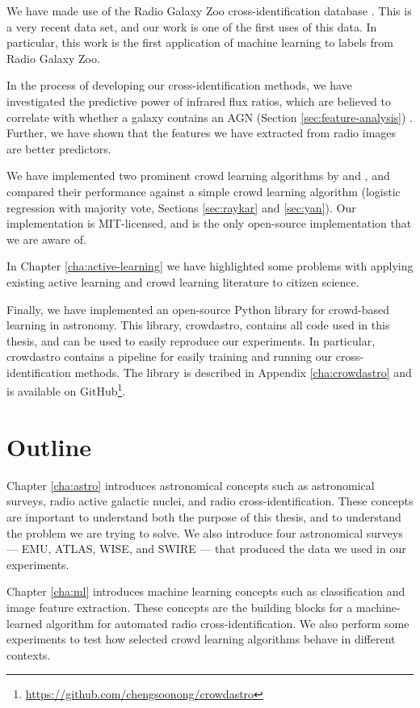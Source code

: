   We have made use of the Radio Galaxy Zoo cross-identification database
  \citep{banfield15}. This is a very recent data set, and our work is one of the
  first uses of this data. In particular, this work is the first application of
  machine learning to labels from Radio Galaxy Zoo.

  In the process of developing our cross-identification methods, we have
  investigated the predictive power of infrared flux ratios, which are believed
  to correlate with whether a galaxy contains an AGN (Section
  \ref{sec:feature-analysis}) \citep{banfield15}. Further, we have shown that
  the features we have extracted from radio images are better predictors.

  We have implemented two prominent crowd learning algorithms by
  \citet{raykar10} and \citet{yan10}, and compared their performance against a
  simple crowd learning algorithm (logistic regression with majority vote,
  Sections \ref{sec:raykar} and \ref{sec:yan}). Our implementation is
  MIT-licensed, and is the only open-source implementation that we are aware of.

  In Chapter \ref{cha:active-learning} we have highlighted some problems with
  applying existing active learning and crowd learning literature to citizen
  science.

  Finally, we have implemented an open-source Python library for crowd-based
  learning in astronomy. This library, crowdastro, contains all code used in
  this thesis, and can be used to easily reproduce our experiments. In
  particular, crowdastro contains a pipeline for easily training and running our
  cross-identification methods. The library is described in Appendix
  \ref{cha:crowdastro} and is available on
  GitHub\footnote{\url{https://github.com/chengsoonong/crowdastro}}.

\section{Outline}
\label{sec:outline}
  
  Chapter \ref{cha:astro} introduces astronomical concepts such as astronomical
  surveys, radio active galactic nuclei, and radio cross-identification. These
  concepts are important to understand both the purpose of this thesis, and to
  understand the problem we are trying to solve. We also introduce four
  astronomical surveys --- EMU, ATLAS, WISE, and SWIRE --- that produced the
  data we used in our experiments.

  Chapter \ref{cha:ml} introduces machine learning concepts such as
  classification and image feature extraction. These concepts are the building
  blocks for a machine-learned algorithm for automated radio
  cross-identification. We also perform some experiments to test how selected
  crowd learning algorithms behave in different contexts.

